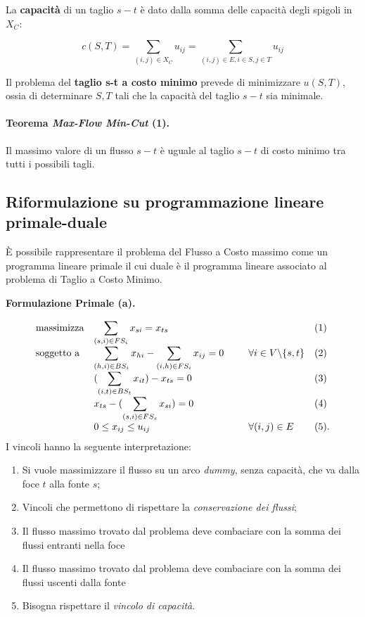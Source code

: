 \documentclass{article}
\begin{document}
La \textbf{capacità} di un taglio $s-t$ è dato dalla somma delle capacità degli spigoli in $X_C$:

\[c(S,T) = \sum_{(i, j) \in X_{C}} u_{ij} = \sum_{(i,j) \in E, i \in S, j \in T} u_{ij} \]

Il problema del \textbf{taglio s-t a costo minimo} prevede di minimizzare $u(S,T)$, ossia di determinare $S, T$ tali che la capacità del taglio $s-t$ sia minimale.

\paragraph{Teorema \emph{Max-Flow Min-Cut} (1).} Il massimo valore di un flusso $s-t$ è uguale al taglio $s-t$ di costo minimo tra tutti i possibili tagli.\cite{Ford:1956:MFT}
\pagebreak

\subsection{Riformulazione su programmazione lineare primale-duale}

È possibile rappresentare il problema del Flusso a Costo massimo come un programma lineare primale il cui duale è il programma lineare associato al problema di Taglio a Costo Minimo.

\textbf{Formulazione Primale (a).}

\begin{equation*}
    \begin{array}{ll@{}ll}
    \text{massimizza}   & \displaystyle\sum_{(s, i) \in FS_{i}} x_{si} = x_{ts} & \;\;\;\;\;\;\;\;\; &(1)\\
    \text{soggetto a}   & \displaystyle\sum_{(h, i) \in BS_{i}} x_{hi} - \sum_{(i, h) \in FS_{i}} x_{ij} = 0 \;\;\;\;\;\;\;\;\; &    \forall i \in V \backslash \{s,t\}&(2)\\
                        & (\displaystyle\sum_{(i, t) \in BS_{t}} x_{it}) - x_{ts} = 0 & &(3)\\
                        &  x_{ts} - (\displaystyle\sum_{(s,i) \in FS_{s}} x_{si}) = 0 & &(4)\\
                        &0 \leq x_{ij} \leq u_{ij} & \forall (i,j) \in E &(5).
    \end{array}
    \end{equation*}
I vincoli hanno la seguente interpretazione:
\begin{enumerate}
    \item Si vuole massimizzare il flusso su un arco \emph{dummy}, senza capacità, che va dalla foce $t$ alla fonte $s$;
    \item Vincoli che permettono di rispettare la \emph{conservazione dei flussi};
    \item Il flusso massimo trovato dal problema deve combaciare con la somma dei flussi entranti nella foce
    \item Il flusso massimo trovato dal problema deve combaciare con la somma dei flussi uscenti dalla fonte
    \item Bisogna rispettare il \emph{vincolo di capacità}.
\end{enumerate}
\end{document}
